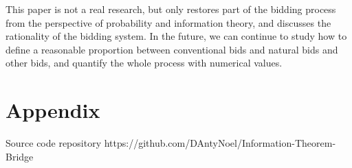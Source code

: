 \documentclass[11pt]{article}
\begin{document}
This paper is not a real research, but only restores part of the bidding process from the perspective of probability and information theory, and discusses the rationality of the bidding system. In the future, we can continue to study how to define a reasonable proportion between conventional bids and natural bids and other bids, and quantify the whole process with numerical values.

\section{Appendix}
Source code repository https://github.com/DAntyNoel/Information-Theorem-Bridge




\end{document}
